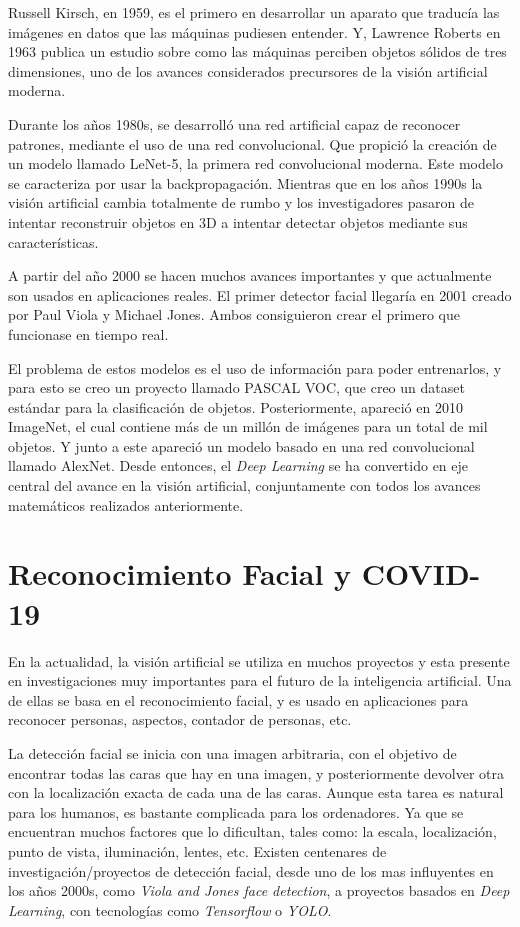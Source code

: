 Russell Kirsch, en 1959, es el primero en desarrollar un aparato que traducía las imágenes en datos que las máquinas pudiesen entender. Y, Lawrence Roberts en 1963 publica un estudio sobre como las máquinas perciben objetos sólidos de tres dimensiones, uno de los avances considerados precursores de la visión artificial moderna.

Durante los años 1980s, se desarrolló una red artificial capaz de reconocer patrones, mediante el uso de una red convolucional. Que propició la creación de un modelo llamado LeNet-5, la primera red convolucional moderna. Este modelo se caracteriza por usar la backpropagación. Mientras que en los años 1990s la visión artificial cambia totalmente de rumbo y los investigadores pasaron de intentar reconstruir objetos en 3D a intentar detectar objetos mediante sus características.

A partir del año 2000 se hacen muchos avances importantes y que actualmente son usados en aplicaciones reales. El primer detector facial llegaría en 2001 creado por Paul Viola y Michael Jones. Ambos consiguieron crear el primero que funcionase en tiempo real.

El problema de estos modelos es el uso de información para poder entrenarlos, y para esto se creo un proyecto llamado PASCAL VOC, que creo un dataset estándar para la clasificación de objetos. Posteriormente, apareció en 2010 ImageNet, el cual contiene más de un millón de imágenes para un total de mil objetos. Y junto a este apareció un modelo basado en una red convolucional llamado AlexNet. Desde entonces, el \textit{Deep Learning} se ha convertido en eje central del avance en la visión artificial, conjuntamente con todos los avances matemáticos realizados anteriormente.

\section{Reconocimiento Facial y COVID-19}

En la actualidad, la visión artificial se utiliza en muchos proyectos y esta presente en investigaciones muy importantes para el futuro de la inteligencia artificial. Una de ellas se basa en el reconocimiento facial, y es usado en aplicaciones para reconocer personas, aspectos, contador de personas, etc. 

La detección facial se inicia con una imagen arbitraria, con el objetivo de encontrar todas las caras que hay en una imagen, y posteriormente devolver otra con la localización exacta de cada una de las caras. Aunque esta tarea es natural para los humanos, es bastante complicada para los ordenadores. Ya que se encuentran muchos factores que lo dificultan, tales como: la escala, localización, punto de vista, iluminación, lentes, etc. Existen centenares de investigación/proyectos de detección facial, desde uno de los mas influyentes en los años 2000s, como \textit{Viola and Jones face detection}, a proyectos basados en \textit{Deep Learning}, con tecnologías como \textit{Tensorflow} o \textit{YOLO}. \cite{szeliski_2018}

